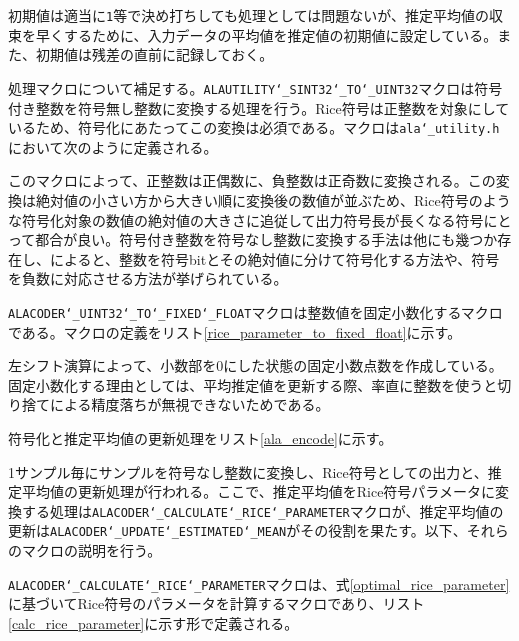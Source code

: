 \documentclass[uplatex,dvipdfmx,b5j,10pt]{jsbook}
\theoremstyle{definition}
\begin{document}
初期値は適当に\texttt{1}等で決め打ちしても処理としては問題ないが、推定平均値の収束を早くするために、入力データの平均値を推定値の初期値に設定している。また、初期値は残差の直前に記録しておく。

処理マクロについて補足する。\texttt{ALAUTILITY\char`_SINT32\char`_TO\char`_UINT32}マクロは符号付き整数を符号無し整数に変換する処理を行う。Rice符号は正整数を対象にしているため、符号化にあたってこの変換は必須である。マクロは\texttt{ala\char`_utility.h}において次のように定義される。


このマクロによって、正整数は正偶数に、負整数は正奇数に変換される。この変換は絶対値の小さい方から大きい順に変換後の数値が並ぶため、Rice符号のような符号化対象の数値の絶対値の大きさに追従して出力符号長が長くなる符号にとって都合が良い。符号付き整数を符号なし整数に変換する手法は他にも幾つか存在し、\cite{compressprog}によると、整数を符号bitとその絶対値に分けて符号化する方法や、符号を負数に対応させる方法が挙げられている。

\texttt{ALACODER\char`_UINT32\char`_TO\char`_FIXED\char`_FLOAT}マクロは整数値を固定小数化するマクロである。マクロの定義をリスト\ref{rice_parameter_to_fixed_float}に示す。


左シフト演算によって、小数部を0にした状態の固定小数点数を作成している。固定小数化する理由としては、平均推定値を更新する際、率直に整数を使うと切り捨てによる精度落ちが無視できないためである。

符号化と推定平均値の更新処理をリスト\ref{ala_encode}に示す。


1サンプル毎にサンプルを符号なし整数に変換し、Rice符号としての出力と、推定平均値の更新処理が行われる。ここで、推定平均値をRice符号パラメータに変換する処理は\texttt{ALACODER\char`_CALCULATE\char`_RICE\char`_PARAMETER}マクロが、推定平均値の更新は\texttt{ALACODER\char`_UPDATE\char`_ESTIMATED\char`_MEAN}がその役割を果たす。以下、それらのマクロの説明を行う。

\texttt{ALACODER\char`_CALCULATE\char`_RICE\char`_PARAMETER}マクロは、式\ref{optimal_rice_parameter}に基づいてRice符号のパラメータを計算するマクロであり、リスト\ref{calc_rice_parameter}に示す形で定義される。

\end{document}
